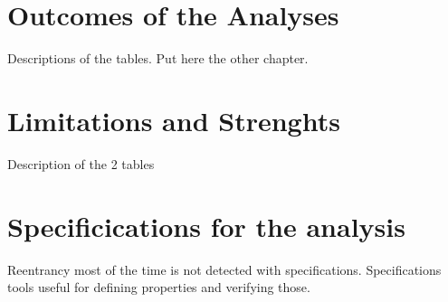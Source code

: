 \section{Outcomes of the Analyses}
Descriptions of the tables.
Put here the other chapter.

\section{Limitations and Strenghts}
Description of the 2 tables 

\section{Specificications for the analysis}
Reentrancy most of the time is not detected with specifications. 
Specifications tools useful for defining properties and verifying those.


